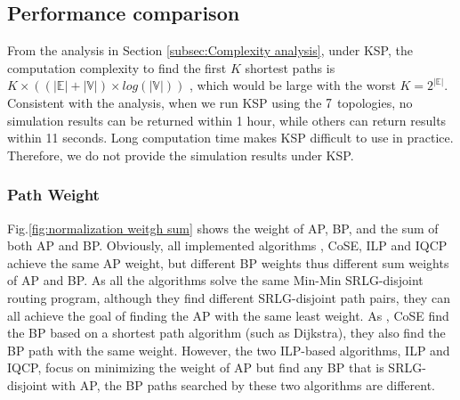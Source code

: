 \subsection{Performance comparison}
From the analysis in Section \ref{subsec:Complexity analysis}, under KSP, the computation complexity to find the first $K$ shortest paths is $K\times ((|\mathbb{E}|+|\mathbb{V}|)\times log(|\mathbb{V}|))$ , which would be large with the worst $K=2^{|\mathbb{E}|}$.
 Consistent with the analysis, when we run KSP using the $7$ topologies, no simulation results can be returned within 1 hour, while others can return results within 11 seconds. Long computation time makes KSP difficult to use in practice. Therefore, we do not provide the simulation results under KSP.

\subsubsection{Path Weight}
Fig.\ref{fig:normalization weitgh sum} shows the weight of AP, BP, and the sum of both AP and BP. Obviously, all implemented algorithms \CI, CoSE, ILP and IQCP achieve the same AP weight, but different BP weights thus different sum weights of AP and BP. As all the algorithms solve the same Min-Min SRLG-disjoint routing program, although they find different SRLG-disjoint path pairs, they can all achieve the goal of finding the  AP with the same least weight.
As \CI, CoSE find the  BP based on a shortest path algorithm (such as Dijkstra), they also find the BP path with the same weight. However, the two ILP-based algorithms, ILP and IQCP, focus on minimizing the weight of AP but find any BP that is SRLG-disjoint with AP, the BP paths searched by these two algorithms are different.


